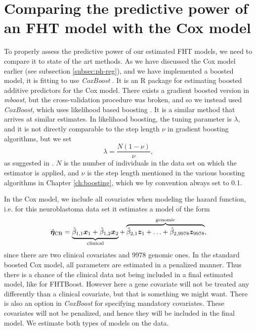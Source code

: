 \section{Comparing the predictive power of an FHT model with the Cox model}
To properly assess the predictive power of our estimated FHT models, we need to compare it to state of the art methods.
As we have discussed the Cox model earlier (see subsection \ref{subsec:ph-reg}), and we have implemented a boosted model, it is fitting to use \textit{CoxBoost} \citep{coxboost}.
It is an R package for estimating boosted additive predictors for the Cox model.
There exists a gradient boosted version in \textit{mboost}, but the cross-validation procedure was broken, and so we instead used \textit{CoxBoost}, which uses likelihood based boosting \citep{gamboost}.
It is a similar method that arrives at similar estimates.
In likelihood boosting, the tuning parameter is $\lambda$, and it is not directly comparable to the step length $\nu$ in gradient boosting algorithms, but we set
\begin{equation}\label{eq:lambda-nu}
    \lambda=\frac{N(1-\nu)}{\nu},
\end{equation}
as suggested in \citet{DeBin2016}.
$N$ is the number of individuals in the data set on which the estimator is applied, and $\nu$ is the step length mentioned in the various boosting algorithms in Chapter \ref{ch:boosting}, which we by convention always set to 0.1.

In the Cox model, we include all covariates when modeling the hazard function, i.e. for this neuroblastoma data set it estimates a model of the form
\begin{equation*}
    \hat{\boldsymbol{\eta}}_{\text{CB}}=\underbrace{\hat{\beta}_{1,1}\bm{x}_1+\hat{\beta}_{1,2}\bm{x}_{2}}_{\text{clinical}}+\overbrace{\hat{\beta}_{2,1}\bm{z}_1+\ldots+\hat{\beta}_{2,9978}\bm{z}_{9978}}^{\text{genomic}},
\end{equation*}
since there are two clinical covariates and 9978 genomic ones.
In the standard boosted Cox model, all parameters are estimated in a penalized manner.
Thus there is a chance of the clinical data not being included in a final estimated model, like for FHTBoost.
However here a gene covariate will not be treated any differently than a clinical covariate, but that is something we might want.
There is also an option in \textit{CoxBoost} for specifying mandatory covariates.
These covariates will not be penalized, and hence they will be included in the final model.
We estimate both types of models on the data.

